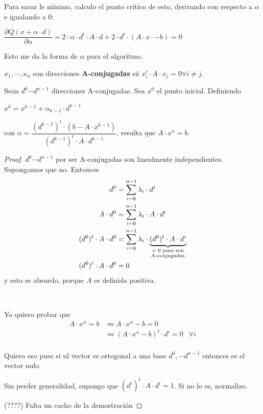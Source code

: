 \documentclass[]{article}
\begin{document}
Para sacar le mínimo, calculo el punto crítico de esto, derivando con respecto a $\alpha$ e igualando a 0:
\begin{center}
	$\dfrac{\partial Q(x+\alpha\cdot d)}{\partial \alpha} = 2 \cdot \alpha \cdot d^t \cdot A \cdot d + 2 \cdot d^t \cdot (A \cdot x \cdot - b) = 0$\\
\end{center}


Esto me da la forma de $\alpha$ para el algoritmo.

\begin{defi}
	$x_1,\cdots,x_n$ son direcciones \textbf{A-conjugadas} sii $x_i^t\cdot A\cdot x_j = 0 \forall i\neq j$.
\end{defi}

\begin{prop}
	Sean $d^0\cdots d^{n-1}$ direcciones A-conjugadas. Sea $x^0$ el punto inicial. Definiendo
	\begin{center}
		$x^k = x^{k-1} + \alpha_{k-1}\cdot d^{k-1}$
	\end{center}
	con $\alpha = \dfrac{({d^{k-1}})^t \cdot (b-A\cdot x^{k-1})}{({d^{k-1}})^t \cdot A \cdot d^{k-1}}$, resulta que $A\cdot x^n = b$.
	\begin{proof}
		$d^0\cdots d^{n-1}$ por ser A-conjugadas son linealmente independientes. Supongamos que no. Entonces
		\begin{align*}
			d^0 &= \sum_{i=0}^{n-1}{\lambda_i\cdot d^i}\\
			A\cdot d^0 &= \sum_{i=0}^{n-1}{\lambda_i\cdot A\cdot d^i}\\
			(d^0)^t\cdot A\cdot d^0 &= \sum_{i=0}^{n-1}{\lambda_i\cdot \underbrace{(d^0)^t\cdot A\cdot d^i}_{\substack{\text{$=0$ pues son} \\ \text{A-conjugadas}}}}\\
			(d^0)^t\cdot A\cdot d^0 &= 0\\
		\end{align*}
		y esto es absurdo, porque $A$ es definida positiva.

		~\newline

		Yo quiero probar que
		\begin{align*}
			A\cdot x^n = b &\Leftrightarrow A\cdot x^n - b = 0\\
			&\Leftrightarrow (A\cdot x^n-b)^t\cdot d^i = 0 & \forall i\\
		\end{align*}

		Quiero eso pues si ul vector es ortogonal a una base $d^0,\cdots d^{n-1}$ entonces es el vector nulo.



		Sin perder generalidad, supongo que $(d^i)^t\cdot A \cdot d^i=1$. Si no lo es, normalizo.

		(????) Falta un cacho de la demostración
	\end{proof}
\end{prop}
\end{document}
